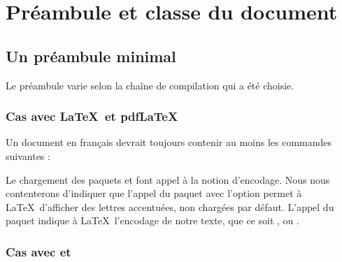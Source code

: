 
\chapter{Préambule et classe du document}
\mtcaddchapter

\label{classe}
\section{Un préambule minimal} 

Le préambule varie selon la chaîne de compilation qui a été choisie.

\subsection{Cas avec \LaTeX\ et pdf\LaTeX}

Un document en français devrait toujours contenir au moins les commandes suivantes :


Le chargement des paquets  et  font appel à la notion d'encodage. Nous nous contenterons d'indiquer que l'appel du paquet  avec l'option  permet à \LaTeX\ d'afficher des lettres accentuées, non chargées par défaut. L'appel du paquet  indique à \LaTeX\ l'encodage de notre texte, que ce soit ,  ou .

\subsection{Cas avec \XeLaTeXtitre et \LuaLaTeXtitre} \label{xelualatex}

